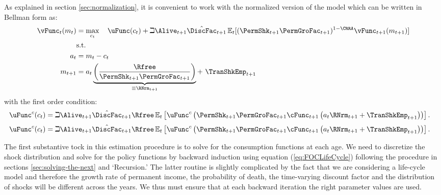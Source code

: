 \documentclass[titlepage, headings=optiontotocandhead]{Resources/texmf-local/tex/latex/econtex}
\begin{document}
As explained in section \ref{sec:normalization}, it is convenient to work with the normalized version of the model which can be written in Bellman form as:
  \begin{equation*}\begin{gathered}\begin{aligned}
        {\vFunc}_{t}({m}_{t})  & = \max_{{c}_{t}}~~~ \uFunc({c}_{t})+\beth\Alive_{t+1}\hat{\DiscFac}_{t+1}
        \Ex_{t}[(\PermShk_{t+1}\PermGroFac_{t+1})^{1-\CRRA}{\vFunc}_{t+1}({m}_{t+1})]   \\
        & \text{s.t.}   \nonumber \\
        {a}_{t}    & = {m}_{t}-{c}_{t} \nonumber
        \\      {m}_{t+1}  & = {a}_{t}\underbrace{\left(\frac{\Rfree}{\PermShk_{t+1}\PermGroFac_{t+1}}\right)}_{\equiv \RNrm_{t+1}}+ ~\TranShkEmp_{t+1}
      \end{aligned}\end{gathered}\end{equation*}
with the first order condition:
  \begin{equation}\begin{gathered}\begin{aligned}
        \uFunc^{{c}}({c}_{t}) & = \beth\Alive_{t+1}\hat{\DiscFac}_{t+1}\Rfree \Ex_{t}\left[\uFunc^{{c}}\left(\PermShk_{t+1}\PermGroFac_{t+1}\cFunc_{t+1}\left({a}_{t}\RNrm_{t+1}+\TranShkEmp_{t+1}\right)\right)\right]\label{eq:FOCLifeCycle}
        .
      \end{aligned}\end{gathered}\end{equation}
  \begin{equation}\begin{gathered}\begin{aligned}
        \uFunc^{{c}}({c}_{t}) & = \beth\Alive_{t+1}\hat{\DiscFac}_{t+1}\Rfree \Ex_{t}\left[\uFunc^{{c}}\left(\PermShk_{t+1}\PermGroFac_{t+1}\cFunc_{t+1}\left({a}_{t}\RNrm_{t+1}+\TranShkEmp_{t+1}\right)\right)\right]\label{eq:FOCLifeCycle}
        .
      \end{aligned}\end{gathered}\end{equation}


The first substantive {tock} in this estimation procedure is
to solve for the consumption functions at each age. We need to
discretize the shock distribution and solve for the policy
functions by backward induction using equation (\ref{eq:FOCLifeCycle})
following the procedure in sections \ref{sec:solving-the-next} and
`Recursion.' The latter routine
is slightly complicated by the fact that we are considering a
life-cycle model and therefore the growth rate of permanent income,
the probability of death, the time-varying discount factor and the
distribution of shocks will be different across the years. We thus
must ensure that at each backward iteration the right parameter
values are used.
\end{document}
